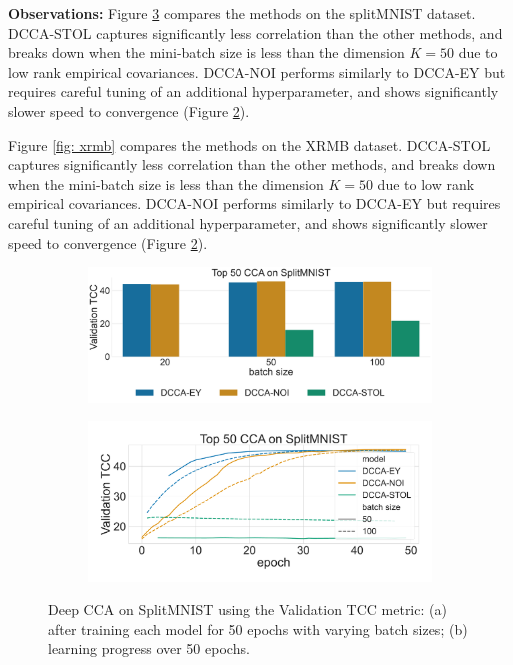 \textbf{Observations:}
Figure \ref{fig: mnist} compares the methods on the splitMNIST dataset.
DCCA-STOL captures significantly less correlation than the other methods, and breaks down when the mini-batch size is less than the dimension $K=50$ due to low rank empirical covariances.
DCCA-NOI performs similarly to DCCA-EY but requires careful tuning of an additional hyperparameter, and shows significantly slower speed to convergence (Figure \ref{fig:lr_mnist}).

Figure \ref{fig: xrmb} compares the methods on the XRMB dataset.
DCCA-STOL captures significantly less correlation than the other methods, and breaks down when the mini-batch size is less than the dimension $K=50$ due to low rank empirical covariances.
DCCA-NOI performs similarly to DCCA-EY but requires careful tuning of an additional hyperparameter, and shows significantly slower speed to convergence (Figure \ref{fig:lr_mnist}).

\begin{figure}
    \centering
    \begin{subfigure}[b]{0.49\textwidth}
        \centering
        \includegraphics[width=\textwidth]{figures/DCCA/SplitMNIST_models_different_batch_sizes}
        \caption{}
        \label{fig:corr_mnist}
    \end{subfigure}
    \hfill
    \begin{subfigure}[b]{0.49\textwidth}
        \centering
        \includegraphics[width=\textwidth]{figures/DCCA/SplitMNIST_allbatchsizes_pcc}
        \caption{}
        \label{fig:lr_mnist}
    \end{subfigure}
    \caption{Deep CCA on SplitMNIST using the Validation TCC metric: (a) after training each model for 50 epochs with varying batch sizes; (b) learning progress over 50 epochs.}
    \label{fig: mnist}
\end{figure}

